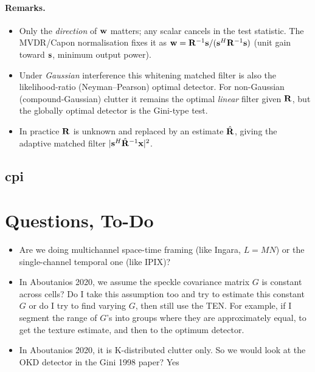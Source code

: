 \documentclass{article}
\begin{document}
\paragraph{Remarks.}
\begin{itemize}
  \item Only the \emph{direction} of $\vb w$ matters; any scalar cancels in the test
  statistic. The MVDR/Capon normalisation fixes it as
  $\vb w = \vb R^{-1}\vb s/(\vb s^H\vb R^{-1}\vb s)$ (unit gain toward $\vb s$,
  minimum output power).
  \item Under \emph{Gaussian} interference this whitening matched filter is also the
  likelihood-ratio (Neyman--Pearson) optimal detector. For non-Gaussian
  (compound-Gaussian) clutter it remains the optimal \emph{linear} filter given
  $\vb R$, but the globally optimal detector is the Gini-type test.
  \item In practice $\vb R$ is unknown and replaced by an estimate $\hat{\vb R}$,
  giving the adaptive matched filter $|\vb s^H\hat{\vb R}^{-1}\vb x|^2$.
\end{itemize}

\subsection{\gls{cpi}}


\newpage
\section{Questions, To-Do}
\begin{itemize}
    \item Are we doing multichannel space-time framing (like Ingara, $L = MN$) or the single-channel temporal one (like IPIX)?
    \item In Aboutanios 2020, we assume the speckle covariance matrix $G$ is constant across cells? Do I take this assumption too and try to estimate this constant $G$ or do I try to find varying $G$, then still use the TEN. For example, if I segment the range of $G$'s into groups where they are approximately equal, to get the texture estimate, and then to the optimum detector.
    \item In Aboutanios 2020, it is K-distributed clutter only. So we would look at the OKD detector in the Gini 1998 paper? Yes
\end{itemize}
\end{document}
